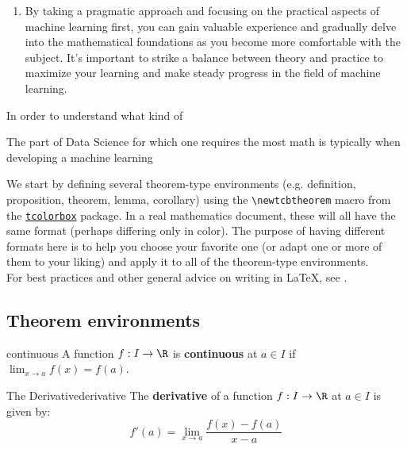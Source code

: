\documentclass[10pt]{extarticle}
\newcommand{\limx}[1][a]{\lim_{x\to#1}}
\newcommand{\<}{\langle}
\renewcommand{\>}{\rangle}
\theoremstyle{mystyle}{\newtheorem*{remark}{Remark}}
\theoremstyle{mystyle}{\newtheorem*{remarks}{Remarks}}
\theoremstyle{mystyle}{\newtheorem*{example}{Example}}
\theoremstyle{mystyle}{\newtheorem*{examples}{Examples}}
\theoremstyle{definition}{\newtheorem*{exercise}{Exercise}}
\theoremstyle{warn}
\begin{document}
\begin{enumerate}
\item By taking a pragmatic approach and focusing on the practical aspects of machine learning first, you can gain valuable experience and gradually delve into the mathematical foundations as you become more comfortable with the subject. It's important to strike a balance between theory and practice to maximize your learning and make steady progress in the field of machine learning.
\end{enumerate}


In order to understand what kind of 

The part of Data Science for which one requires the most math is typically when developing a machine learning 



We start by defining several theorem-type environments (e.g. definition, proposition, theorem, lemma, corollary) using the \verb!\newtcbtheorem! macro from the \href{https://ctan.org/pkg/tcolorbox}{\texttt{tcolorbox}} package. In a real mathematics document, these will all have the same format (perhaps differing only in color). The purpose of having different formats here is to help you choose your favorite one (or adapt one or more of them to your liking) and apply it to all of the theorem-type environments.\\

For best practices and other general advice on writing in \LaTeX, see \cite{evanchen,gleave}.



\subsection{Theorem environments}

\begin{definition}{}{continuous}
A function $f:I\to\R$ is \textbf{continuous} at $a\in I$ if $\limx f(x)=f(a)$.
\end{definition}

\begin{definition}{The Derivative}{derivative}
The \textbf{derivative} of a function $f:I\to\R$ at $a\in I$ is given by:
\begin{equation*}
    f'(a)=\limx\frac{f(x)-f(a)}{x-a}
\end{equation*}
\end{definition}
\end{document}
